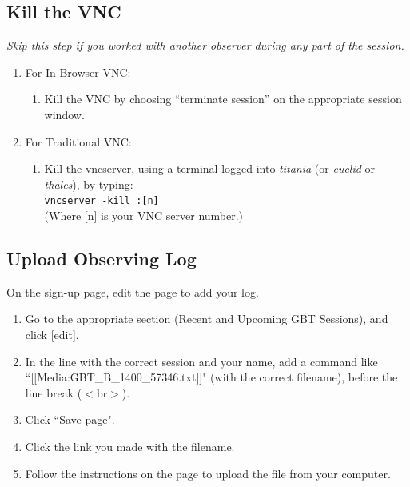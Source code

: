 \documentclass[11pt, reqno, tbtags]{article}
\begin{document}
\subsection{Kill the VNC}  %
\textit{Skip this step if you worked with another observer during any part of the session.}
\begin{enumerate}
 \item For In-Browser VNC:
 \begin{enumerate}
  \item Kill the VNC by choosing ``terminate session'' on the appropriate session window.
  \end{enumerate}
 \item For Traditional VNC:
  \begin{enumerate}  
\item Kill the vncserver, using a terminal logged into \textit{titania} (or \textit{euclid} or \textit{thales}), by typing: \\
\indent\texttt{vncserver -kill :[n]}\\
 (Where [n] is your VNC server number.)                      
 \end{enumerate}
\end{enumerate}


\subsection{Upload Observing Log}\label{ssec:log}  %
On the sign-up page\footnotemark[1], 
edit the page to add your log.  \begin{enumerate}
 \item Go to the appropriate section (Recent and Upcoming GBT Sessions), and click [edit]. 
 \item In the line with the correct session and your name, add a command like \\
 ``[[Media:GBT\_B\_1400\_57346.txt]]" (with the correct filename), before the line break ($<$br$>$).  
 \item Click ``Save page".  
 \item Click the link you made with the filename.  
 \item Follow the instructions on the page to upload the file from your computer.  
\end{enumerate}


\end{document}
